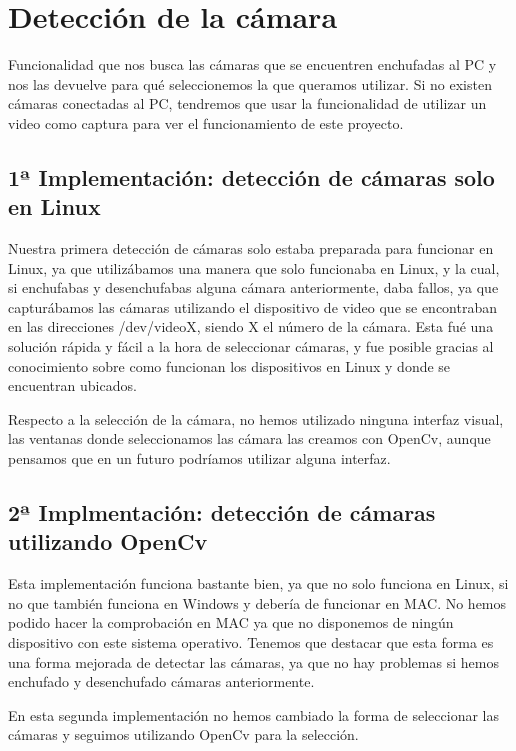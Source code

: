 \documentclass[12pt,a4papert,woside,openright,titlepage,final]{book}
\begin{document}
\section{Detección de la cámara} 

Funcionalidad que nos busca las cámaras que se encuentren enchufadas al PC y nos
las devuelve para qué seleccionemos la que queramos utilizar. Si no existen
cámaras conectadas al PC, tendremos que usar la funcionalidad de utilizar un
video como captura para ver el funcionamiento de este proyecto.  

\subsection{1ª Implementación: detección de cámaras solo en Linux}

Nuestra primera detección de cámaras solo estaba preparada para funcionar en
Linux, ya que utilizábamos una manera que solo funcionaba en Linux, y la cual,
si enchufabas y desenchufabas alguna cámara anteriormente, daba fallos, ya que
capturábamos las cámaras utilizando el dispositivo de video que se encontraban
en las direcciones /dev/videoX, siendo X el número de la cámara. Esta fué una
solución rápida y fácil a la hora de seleccionar cámaras, y fue posible gracias
al conocimiento sobre como funcionan los dispositivos en Linux y donde se
encuentran ubicados. 

Respecto a la selección de la cámara, no hemos utilizado ninguna interfaz
visual, las ventanas donde seleccionamos las cámara las creamos con OpenCv,
aunque pensamos que en un futuro podríamos utilizar alguna interfaz. 

\subsection{2ª Implmentación: detección de cámaras utilizando OpenCv}

Esta implementación funciona bastante bien, ya que no solo funciona en Linux, si
no que también funciona en Windows y debería de funcionar en MAC. No hemos
podido hacer la comprobación en MAC ya que no disponemos de ningún dispositivo
con este sistema operativo. Tenemos que destacar que esta forma es una forma
mejorada de detectar las cámaras, ya que no hay problemas si hemos enchufado y
desenchufado cámaras anteriormente.

En esta segunda implementación no hemos cambiado la forma de seleccionar las
cámaras y seguimos utilizando OpenCv para la selección. 
\end{document}
